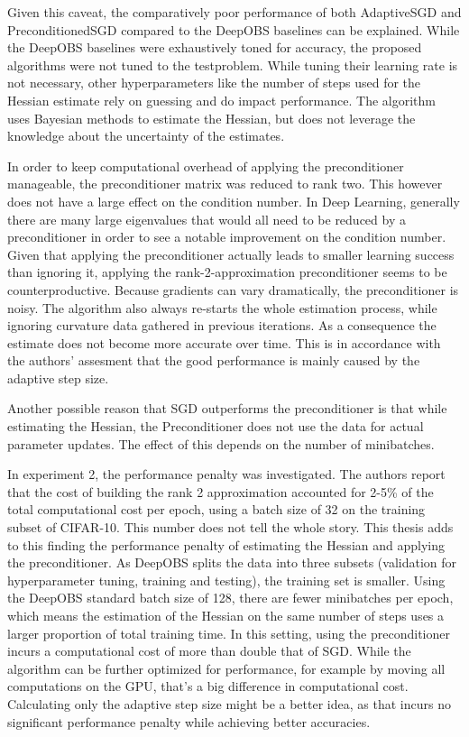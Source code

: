\documentclass[twoside,12pt,a4paper]{report}
\begin{document}
Given this caveat, the comparatively poor performance of both AdaptiveSGD and PreconditionedSGD compared to the DeepOBS baselines can be explained. While the DeepOBS baselines were exhaustively toned for accuracy, the proposed algorithms were not tuned to the testproblem. While tuning their learning rate is not necessary, other hyperparameters like the number of steps used for the Hessian estimate rely on guessing and do impact performance. The algorithm uses Bayesian methods to estimate the Hessian, but does not leverage the knowledge about the uncertainty of the estimates.

In order to keep computational overhead of applying the preconditioner manageable, the preconditioner matrix was reduced to rank two. This however does not have a large effect on the condition number. In Deep Learning, generally there are many large eigenvalues  that would all need to be reduced by a preconditioner in order to see a notable improvement on the condition number. Given that applying the preconditioner actually leads to smaller learning success than ignoring it, applying the rank-2-approximation preconditioner seems to be counterproductive. Because gradients can vary dramatically, the preconditioner is noisy. The algorithm also always re-starts the whole estimation process, while ignoring curvature data gathered in previous iterations. As a consequence the estimate does not become more accurate over time. This is in accordance with the authors' assesment that the good performance is mainly caused by the adaptive step size.

Another possible reason that SGD outperforms the preconditioner is that while estimating the Hessian, the Preconditioner does not use the data for actual parameter updates. The effect of this depends on the number of minibatches.


In experiment 2, the performance penalty was investigated. The authors report that the cost of building the rank 2 approximation accounted for 2-5\% of the total computational cost per epoch, using a batch size of 32 on the training subset of CIFAR-10. This number does not tell the whole story. This thesis adds to this finding the performance penalty of estimating the Hessian and applying the preconditioner. As DeepOBS splits the data into three subsets (validation for hyperparameter tuning, training and testing), the training set is smaller. Using the DeepOBS standard batch size of 128, there are fewer minibatches per epoch, which means the estimation of the Hessian on the same number of steps uses a larger proportion of total training time. In this setting, using the preconditioner incurs a computational cost of more than double that of SGD. While the algorithm can be further optimized for performance, for example by moving all computations on the GPU, that's a big difference in computational cost. Calculating only the adaptive step size might be a better idea, as that incurs no significant performance penalty while achieving better accuracies.
\end{document}

